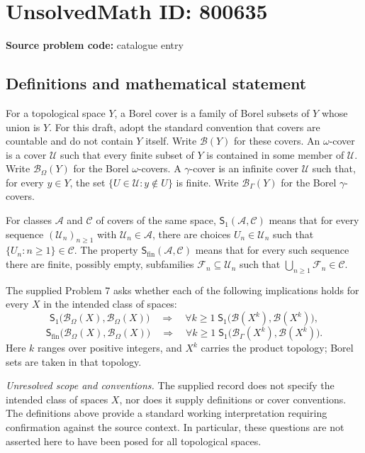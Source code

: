 \documentclass[11pt]{article}
\begin{document}
\section*{UnsolvedMath ID: 800635}
\textbf{Source problem code:} catalogue entry
\subsection{Definitions and mathematical statement}
For a topological space \(Y\), a Borel cover is a family of Borel subsets of \(Y\) whose union is \(Y\). For this draft, adopt the standard convention that covers are countable and do not contain \(Y\) itself. Write \(\mathcal B(Y)\) for these covers. An \(\omega\)-cover is a cover \(\mathcal U\) such that every finite subset of \(Y\) is contained in some member of \(\mathcal U\). Write \(\mathcal B_\Omega(Y)\) for the Borel \(\omega\)-covers. A \(\gamma\)-cover is an infinite cover \(\mathcal U\) such that, for every \(y\in Y\), the set \(\{U\in\mathcal U:y\notin U\}\) is finite. Write \(\mathcal B_\Gamma(Y)\) for the Borel \(\gamma\)-covers.

For classes \(\mathcal A\) and \(\mathcal C\) of covers of the same space, \(\mathsf S_1(\mathcal A,\mathcal C)\) means that for every sequence \((\mathcal U_n)_{n\geq 1}\) with \(\mathcal U_n\in\mathcal A\), there are choices \(U_n\in\mathcal U_n\) such that \(\{U_n:n\geq 1\}\in\mathcal C\). The property \(\mathsf S_{\mathrm{fin}}(\mathcal A,\mathcal C)\) means that for every such sequence there are finite, possibly empty, subfamilies \(\mathcal F_n\subseteq\mathcal U_n\) such that \(\bigcup_{n\geq 1}\mathcal F_n\in\mathcal C\).

The supplied Problem 7 asks whether each of the following implications holds for every \(X\) in the intended class of spaces:
\[
\mathsf S_1\bigl(\mathcal B_\Omega(X),\mathcal B_\Omega(X)\bigr)
\quad\Longrightarrow\quad
\forall k\geq 1\;\mathsf S_1\bigl(\mathcal B(X^k),\mathcal B(X^k)\bigr),
\]
\[
\mathsf S_{\mathrm{fin}}\bigl(\mathcal B_\Omega(X),\mathcal B_\Omega(X)\bigr)
\quad\Longrightarrow\quad
\forall k\geq 1\;\mathsf S_1\bigl(\mathcal B_\Gamma(X^k),\mathcal B(X^k)\bigr).
\]
Here \(k\) ranges over positive integers, and \(X^k\) carries the product topology; Borel sets are taken in that topology.

\textit{Unresolved scope and conventions.} The supplied record does not specify the intended class of spaces \(X\), nor does it supply definitions or cover conventions. The definitions above provide a standard working interpretation requiring confirmation against the source context. In particular, these questions are not asserted here to have been posed for all topological spaces.
\end{document}
